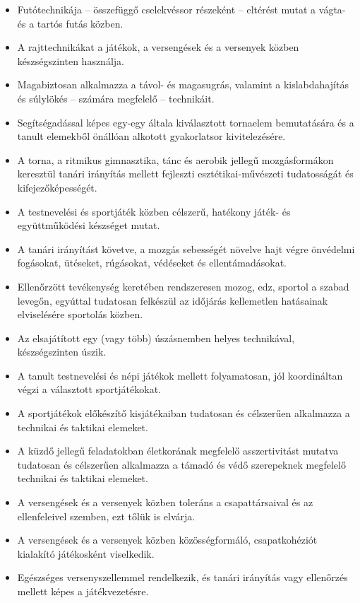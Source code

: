 \begin{itemize}
\item
  Futótechnikája -- összefüggő cselekvéssor részeként -- eltérést mutat
  a vágta- és a tartós futás közben.
\item
  A rajttechnikákat a játékok, a versengések és a versenyek közben
  készségszinten használja.
\item
  Magabiztosan alkalmazza a távol- és magasugrás, valamint a
  kislabdahajítás és súlylökés -- számára megfelelő -- technikáit.
\item
  Segítségadással képes egy-egy általa kiválasztott tornaelem
  bemutatására és a tanult elemekből önállóan alkotott gyakorlatsor
  kivitelezésére.
\item
  A torna, a ritmikus gimnasztika, tánc és aerobik jellegű
  mozgásformákon keresztül tanári irányítás mellett fejleszti
  esztétikai-művészeti tudatosságát és kifejezőképességét.
\item
  A testnevelési és sportjáték közben célszerű, hatékony játék- és
  együttműködési készséget mutat.
\item
  A tanári irányítást követve, a mozgás sebességét növelve hajt végre
  önvédelmi fogásokat, ütéseket, rúgásokat, védéseket és
  ellentámadásokat.
\item
  Ellenőrzött tevékenység keretében rendszeresen mozog, edz, sportol a
  szabad levegőn, egyúttal tudatosan felkészül az időjárás kellemetlen
  hatásainak elviselésére sportolás közben.
\item
  Az elsajátított egy (vagy több) úszásnemben helyes technikával,
  készségszinten úszik.
\item
  A tanult testnevelési és népi játékok mellett folyamatosan, jól
  koordináltan végzi a választott sportjátékokat.
\item
  A sportjátékok előkészítő kisjátékaiban tudatosan és célszerűen
  alkalmazza a technikai és taktikai elemeket.
\item
  A küzdő jellegű feladatokban életkorának megfelelő asszertivitást
  mutatva tudatosan és célszerűen alkalmazza a támadó és védő
  szerepeknek megfelelő technikai és taktikai elemeket.
\item
  A versengések és a versenyek közben toleráns a csapattársaival és az
  ellenfeleivel szemben, ezt tőlük is elvárja.
\item
  A versengések és a versenyek közben közösségformáló, csapatkohéziót
  kialakító játékosként viselkedik.
\item
  Egészséges versenyszellemmel rendelkezik, és tanári irányítás vagy
  ellenőrzés mellett képes a játékvezetésre.

\end{itemize}
